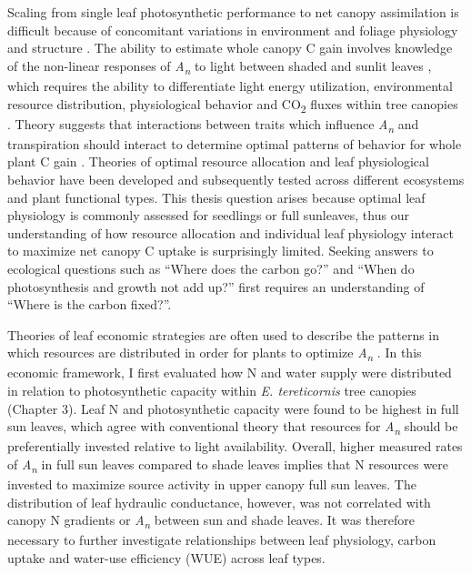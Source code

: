 \documentclass[a4paper]{article}
\begin{document}
Scaling from single leaf photosynthetic performance to net canopy assimilation is difficult because of concomitant variations in environment and foliage physiology and structure \citep{niinemets2009packing}. The ability to estimate whole canopy C gain involves knowledge of the non-linear responses of \textit{A\textsubscript{n}} to light between shaded and sunlit leaves \citep{de1997simple, linderson2012up}, which requires the ability to differentiate  light energy utilization, environmental resource distribution, physiological behavior and CO\textsubscript{2} fluxes within tree canopies \citep{dai2004two, peltoniemi2012co, niinemets2012optimization}. Theory suggests that interactions between traits which influence \textit{A\textsubscript{n}} and transpiration should interact to determine optimal patterns of behavior for whole plant C gain \citep{cgivnish1988adaptation}. Theories of optimal resource allocation and leaf physiological behavior have been developed \citep{cowan1977stomatal, medlyn2011reconciling, peltoniemi2012co} and subsequently tested \citep{wright2003least, heroult2013optimal, prentice2014balancing, lin2015optimal} across different ecosystems and plant functional types. This thesis question arises because optimal leaf physiology is commonly assessed for seedlings or \textquotesingle full sun\textquotesingle leaves, thus our understanding of how resource allocation and individual leaf physiology interact to maximize net canopy C uptake is surprisingly limited. Seeking answers to ecological questions such as \enquote{Where does the carbon go?} and \enquote{When do photosynthesis and growth not add up?} first requires an understanding of \enquote{Where is the carbon fixed?}.

Theories of leaf economic strategies are often used to describe the patterns in which resources are distributed in order for plants to optimize \textit{A\textsubscript{n}} \citep{wright2003least}. In this economic framework, I first evaluated how N and water supply were distributed in relation to photosynthetic capacity within \textit{E. tereticornis} tree canopies (Chapter 3). Leaf N and photosynthetic capacity were found to be highest in full sun leaves, which agree with conventional theory that resources for \textit{A\textsubscript{n}} should be preferentially invested relative to light availability. Overall, higher measured rates of \textit{A\textsubscript{n}} in full sun leaves compared to shade leaves implies that N resources were invested to maximize source activity in upper canopy full sun leaves. The distribution of leaf hydraulic conductance, however, was not correlated with canopy N gradients or \textit{A\textsubscript{n}} between sun and shade leaves. It was therefore necessary to further investigate relationships between leaf physiology, carbon uptake and water-use efficiency (WUE) across leaf types.
\end{document}
